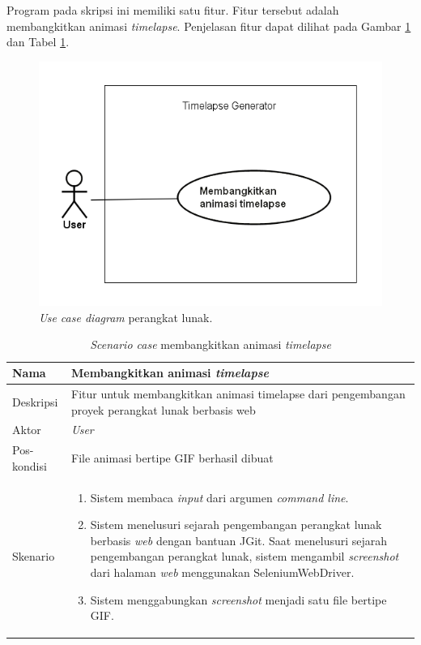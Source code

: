  
Program pada skripsi ini memiliki satu fitur. Fitur tersebut adalah membangkitkan animasi \textit{timelapse}.
Penjelasan fitur dapat dilihat pada Gambar \ref{fig:uc} dan Tabel \ref{tab:tabel_sc_animasi}.



\begin{figure}[H]
	\centering
		\includegraphics[scale=0.8]{Gambar/UseCaseDiagram1.png}
	\caption{\textit{Use case diagram} perangkat lunak.}
	\label{fig:uc}
\end{figure}

\begin{table}[h]
    \centering
    \begin{tabular}{|p{3cm}|p{10cm}|}
    \hline
        Nama & Membangkitkan animasi \textit{timelapse}\\
    \hline
    \hline
        Deskripsi & Fitur untuk membangkitkan animasi timelapse dari pengembangan proyek perangkat lunak berbasis web\\
    \hline
        Aktor & \textit{User} \\
    \hline
        Pos-kondisi &  File animasi bertipe GIF berhasil dibuat\\
    \hline
        Skenario & 
        \begin{enumerate}
        \item Sistem membaca \textit{input} dari argumen \textit{command line}.
            \item Sistem menelusuri sejarah pengembangan perangkat lunak berbasis \textit{web} dengan bantuan
JGit. Saat menelusuri sejarah pengembangan perangkat lunak, sistem mengambil \textit{screenshot} dari halaman \textit{web} menggunakan SeleniumWebDriver.
            \item Sistem menggabungkan \textit{screenshot} menjadi satu file bertipe GIF.
        \end{enumerate}\\
    \hline
    \end{tabular}
    \caption{\textit{Scenario case} membangkitkan animasi \textit{timelapse}}
    \label{tab:tabel_sc_animasi}
\end{table}


